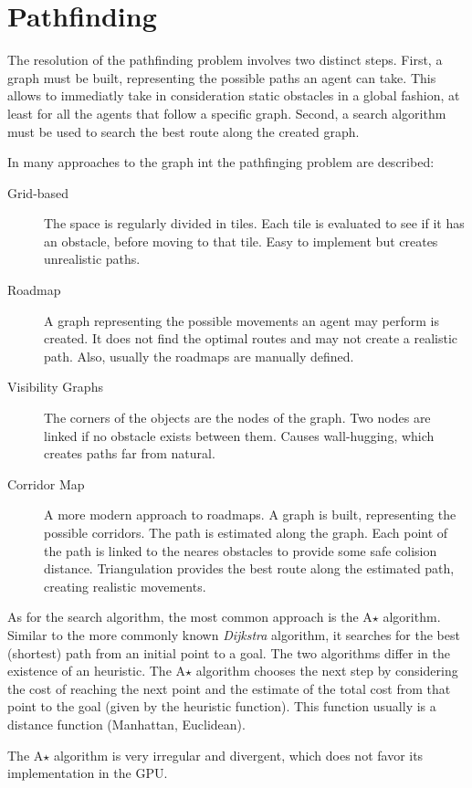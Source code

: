 \section{Pathfinding}

The resolution of the pathfinding problem involves two distinct steps. First, a graph must be built, representing the possible paths an agent can take. This allows to immediatly take in consideration static obstacles in a global fashion, at least for all the agents that follow a specific graph. Second, a search algorithm must be used to search the best route along the created graph.

In \cite{johansson09} many approaches to the graph int the pathfinging problem are described:
\begin{description}
	\item [Grid-based] The space is regularly divided in tiles. Each tile is evaluated to see if it has an obstacle, before moving to that tile. Easy to implement but creates unrealistic paths.
	\item [Roadmap] A graph representing the possible movements an agent may perform is created. It does not find the optimal routes and may not create a realistic path. Also, usually the roadmaps are manually defined.
	\item [Visibility Graphs] The corners of the objects are the nodes of the graph. Two nodes are linked if no obstacle exists between them. Causes wall-hugging, which creates paths far from natural.
	\item [Corridor Map] A more modern approach to roadmaps. A graph is built, representing the possible corridors. The path is estimated along the graph. Each point of the path is linked to the neares obstacles to provide some safe colision distance. Triangulation provides the best route along the estimated path, creating realistic movements. 
\end{description}

As for the search algorithm, the most common approach is the A$\star$ algorithm. Similar to the more commonly known \textit{Dijkstra} algorithm, it searches for the best (shortest) path from an initial point to a goal. The two algorithms differ in the existence of an heuristic. The A$\star$ algorithm chooses the next step by considering the cost of reaching the next point and the estimate of the total cost from that point to the goal (given by the heuristic function). This function usually is a distance function (Manhattan, Euclidean).

The A$\star$ algorithm is very irregular and divergent, which does not favor its implementation in the GPU.